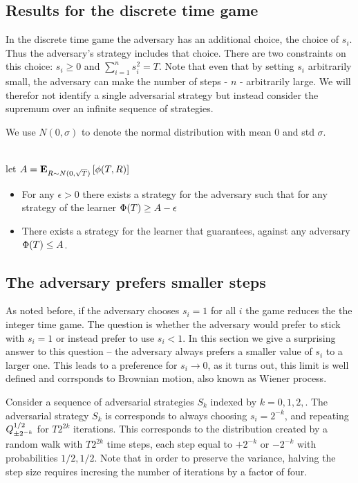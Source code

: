 \documentclass{article}[12pt]
\begin{document}
\subsection{Results for the discrete time game}

In the discrete time game the adversary has an additional choice, the
choice of $s_i$. Thus the adversary's strategy includes that choice.
There are two constraints on this choice: $s_i \geq 0$ and
$\sum_{i=1}^n s_i^2 = T$. Note that even that by setting $s_i$
arbitrarily small, the adversary can make the number of steps - $n$ -
arbitrarily large. We will therefor not identify a single adversarial
strategy but instead consider the supremum over an infinite sequence
of strategies.

We use $N(0,\sigma)$ to denote the normal distribution with mean 0 and
std $\sigma$.

\begin{theorem}
  ~\\

   let $A = {\bf E}_{R \sim N(0,\sqrt{T})}\left[ \phi(T,R) \right]$
   \begin{itemize}
     \item
    For any $\epsilon>0$ there exists a strategy for the adversary
    such that for any strategy of the learner $\Phi(T) \geq A-\epsilon$
  \item
    There exists a strategy for the learner that guarantees, against
    any adversary $\Phi(T) \leq A$.
  \end{itemize}
\end{theorem}


\subsection{The adversary prefers smaller steps} \label{sec:smallsteps}
As noted before, if the adversary chooses $s_i=1$ for all $i$ the game
reduces the the integer time game. The question is whether the
adversary would prefer to stick with $s_i=1$ or instead prefer to use
$s_i<1$. In this section we give a surprising answer to this question
-- the adversary always prefers a smaller value of $s_i$ to a larger
one. This leads to a preference for $s_i \to 0$, as it turns out, this
limit is well defined and corrsponds to Brownian motion, also known as
Wiener process.

Consider a sequence of adversarial strategies $S_k$ indexed by
$k=0,1,2,$. The adversarial strategy $S_k$ is corresponds to always
choosing $s_i = 2^{-k}$, and repeating  $Q^{1/2}_{\pm 2^{-k}}$ 
for $T 2^{2k}$ iterations.
This corresponds to the distribution created by a random walk with
$T 2^{2k}$ time steps, each step equal to $+2^{-k}$ or  $-2^{-k}$ with probabilities $1/2,1/2$.
Note that in order to preserve the variance, halving the step size
requires incresing the number of iterations by a factor of four.
\end{document}
